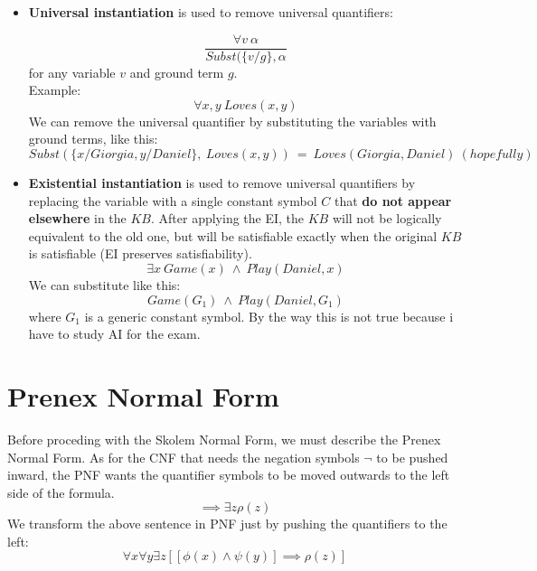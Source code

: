 \documentclass{article}
\begin{document}
\begin{itemize}
    \item \textbf{Universal instantiation} is used to remove universal quantifiers:

    \begin{equation*}
        \frac{\forall v\ \alpha}{Subst(\{v/g\}, \alpha}
    \end{equation*}
    for any variable $v$ and ground term $g$.\\
    Example:\\
    \begin{equation*}
        \forall x, y\ Loves(x,y)
    \end{equation*}
    We can remove the universal quantifier by substituting the variables with ground terms, like this:
    \begin{equation*}
        Subst(\{x/Giorgia,y/Daniel\},\ Loves(x,y))\ =\ Loves(Giorgia, Daniel)\ (hopefully)
    \end{equation*}
        
    \item \textbf{Existential instantiation} is used to remove universal quantifiers by replacing the variable with a single constant symbol $C$ that \textbf{do not appear elsewhere} in the $KB$. After applying the EI, the $KB$ will not be logically equivalent to the old one, but will be satisfiable exactly when the original $KB$ is satisfiable (EI preserves satisfiability).
    \begin{equation*}
        \exists x\ Game(x)\ \land\ Play(Daniel, x) 
    \end{equation*}
    We can substitute like this:
    \begin{equation*}
        Game(G_1)\ \land\ Play(Daniel, G_1) 
    \end{equation*}
    where $G_1$ is a generic constant symbol. By the way this is not true because i have to study AI for the exam.
    
\end{itemize}

\section{Prenex Normal Form}

Before proceding with the Skolem Normal Form, we must describe the Prenex Normal Form. As for the CNF that needs the negation symbols $\neg$ to be pushed inward, the PNF wants the quantifier symbols to be moved outwards to the left side of the formula.
\begin{equation*}
    [\forall x \phi(x) \land \forall y \psi(y)] \implies \exists z \rho(z)
\end{equation*}
We transform the above sentence in PNF just by pushing the quantifiers to the left:
\begin{equation*}
    \forall x \forall y \exists z [[\phi(x) \land \psi(y)] \implies \rho(z)]
\end{equation*}
\end{document}
